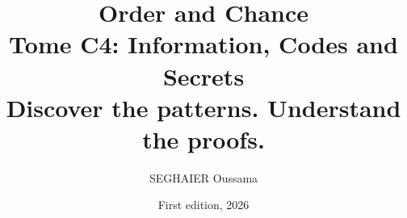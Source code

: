 \documentclass[11pt,openany]{book}
\title{\Huge\textbf{Order and Chance}\\[0.4em]\LARGE Tome C4: Information, Codes and Secrets\\[0.6em]
\Large Discover the patterns. Understand the proofs.}
\author{SEGHAIER Oussama}
\date{First edition, 2026}
\begin{document}
\frontmatter
\makecover
\maketitle

\tableofcontents

\mainmatter





\end{document}

